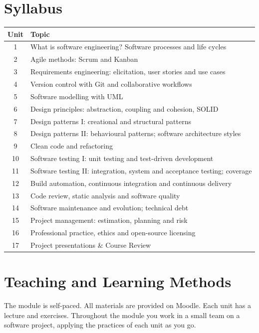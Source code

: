 \documentclass[11pt,a4paper]{article}
\begin{document}
\section{Syllabus}
\begin{tabularx}{\textwidth}{c X}
\toprule
\textbf{Unit} & \textbf{Topic} \\
\midrule
1  & What is software engineering? Software processes and life cycles \\
2  & Agile methods: Scrum and Kanban \\
3  & Requirements engineering: elicitation, user stories and use cases \\
4  & Version control with Git and collaborative workflows \\
5  & Software modelling with UML \\
6  & Design principles: abstraction, coupling and cohesion, SOLID \\
7  & Design patterns I: creational and structural patterns \\
8  & Design patterns II: behavioural patterns; software architecture styles \\
9  & Clean code and refactoring \\
10 & Software testing I: unit testing and test-driven development \\
11 & Software testing II: integration, system and acceptance testing; coverage \\
12 & Build automation, continuous integration and continuous delivery \\
13 & Code review, static analysis and software quality \\
14 & Software maintenance and evolution; technical debt \\
15 & Project management: estimation, planning and risk \\
16 & Professional practice, ethics and open-source licensing \\
17 & Project presentations \& Course Review \\
\bottomrule
\end{tabularx}

\section{Teaching and Learning Methods}
The module is self-paced. All materials are provided on Moodle.
Each unit has a lecture and exercises. Throughout the module you work in a small team
on a software project, applying the practices of each unit as you go.
\end{document}
